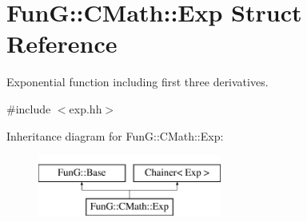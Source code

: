 \hypertarget{structFunG_1_1CMath_1_1Exp}{\section{Fun\-G\-:\-:C\-Math\-:\-:Exp Struct Reference}
\label{structFunG_1_1CMath_1_1Exp}
}


Exponential function including first three derivatives.  




{\ttfamily \#include $<$exp.\-hh$>$}

Inheritance diagram for Fun\-G\-:\-:C\-Math\-:\-:Exp\-:\begin{figure}[H]
\begin{center}
\leavevmode
\includegraphics[height=2.000000cm]{structFunG_1_1CMath_1_1Exp}
\end{center}
\end{figure}
